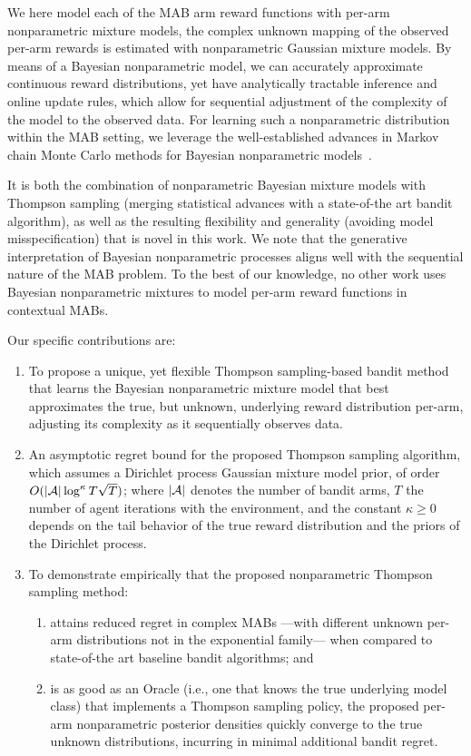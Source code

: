 We here model each of the MAB arm reward functions with per-arm nonparametric mixture models, \ie the complex unknown mapping of the observed per-arm rewards is estimated with nonparametric Gaussian mixture models. By means of a Bayesian nonparametric model, we can accurately approximate continuous reward distributions, yet have analytically tractable inference and online update rules, which allow for sequential adjustment of the complexity of the model to the observed data.
For learning such a nonparametric distribution within the MAB setting, we leverage the well-established advances in Markov chain Monte Carlo methods for Bayesian nonparametric models~\citep{j-Neal2000}.

It is both the combination of nonparametric Bayesian mixture models with Thompson sampling (\ie merging statistical advances with a state-of-the art bandit algorithm), as well as the resulting flexibility and generality (\ie avoiding model misspecification) that is novel in this work.
We note that the generative interpretation of Bayesian nonparametric processes aligns well with the sequential nature of the MAB problem.
To the best of our knowledge, no other work uses Bayesian nonparametric mixtures to model per-arm reward functions in contextual MABs.

Our specific contributions are:
\begin{enumerate}
	\item To propose a unique, yet flexible Thompson sampling-based bandit method that learns the Bayesian nonparametric mixture model that best approximates the true, but unknown, underlying reward distribution per-arm, adjusting its complexity as it sequentially observes data.
	
	\item An asymptotic regret bound for the proposed Thompson sampling algorithm, which assumes a Dirichlet process Gaussian mixture model prior, of order $O(|\mathcal{A}| \log^\kappa T \sqrt{T})$; where $|\mathcal{A}|$ denotes the number of bandit arms, $T$ the number of agent iterations with the environment, and the constant $\kappa\geq 0$ depends on the tail behavior of the true reward distribution and the priors of the Dirichlet process.
	
	\item To demonstrate empirically that the proposed nonparametric Thompson sampling method: 
	\begin{enumerate}
		\item attains reduced regret in complex MABs ---with different unknown per-arm distributions not in the exponential family--- when compared to state-of-the art baseline bandit algorithms; and
		\item is as good as an Oracle (i.e., one that knows the true underlying model class) that implements a Thompson sampling policy, \ie the proposed per-arm nonparametric posterior densities quickly converge to the true unknown distributions, incurring in minimal additional bandit regret.
	\end{enumerate}	
\end{enumerate}

